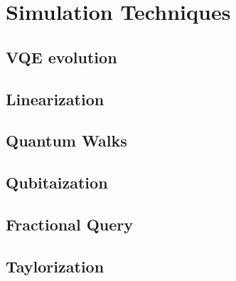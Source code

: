 \section{Simulation Techniques}

\subsection{VQE evolution}


\subsection{Linearization}

\subsection{Quantum Walks}

\subsection{Qubitaization}

\subsection{Fractional Query}

\subsection{Taylorization}
